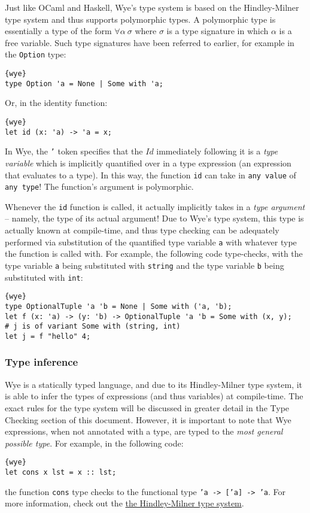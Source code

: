 \documentclass[a4paper, 12pt]{article}
\begin{document}
Just like OCaml and Haskell, Wye's type system is based on the Hindley-Milner type system and thus supports polymorphic types. A polymorphic type is essentially a type of the form $\forall \alpha\:\sigma$ where $\sigma$ is a type signature in which $\alpha$ is a free variable. Such type signatures have been referred to earlier, for example in the \texttt{Option} type:
\begin{lstlisting}{wye}
type Option 'a = None | Some with 'a;
\end{lstlisting}
Or, in the identity function:
\begin{lstlisting}{wye}
let id (x: 'a) -> 'a = x;
\end{lstlisting}
In Wye, the \texttt{'} token specifies that the $Id$ immediately following it is a \textit{type variable} which is implicitly quantified over in a type expression (an expression that evaluates to a type). In this way, the function \texttt{id} can take in \texttt{any value} of \texttt{any type}! The function's argument is polymorphic.

Whenever the \texttt{id} function is called, it actually implicitly takes in a \textit{type argument} -- namely, the type of its actual argument! Due to Wye's type system, this type is actually known at compile-time, and thus type checking can be adequately performed via substitution of the quantified type variable \texttt{a} with whatever type the function is called with. For example, the following code type-checks, with the type variable \texttt{a} being substituted with \texttt{string} and the type variable \texttt{b} being substituted with \texttt{int}:
\begin{lstlisting}{wye}
type OptionalTuple 'a 'b = None | Some with ('a, 'b);
let f (x: 'a) -> (y: 'b) -> OptionalTuple 'a 'b = Some with (x, y);
# j is of variant Some with (string, int)
let j = f "hello" 4;
\end{lstlisting}

\subsubsection{Type inference}

Wye is a statically typed language, and due to its Hindley-Milner type system, it is able to infer the types of expressions (and thus variables) at compile-time. The exact rules for the type system will be discussed in greater detail in the Type Checking section of this document. However, it is important to note that Wye expressions, when not annotated with a type, are typed to the \textit{most general possible type}. For example, in the following code:
\begin{lstlisting}{wye}
let cons x lst = x :: lst;
\end{lstlisting}
the function \texttt{cons} type checks to the functional type \texttt{'a -> ['a] -> 'a}. For more information, check out the \href{{https://en.wikipedia.org/wiki/Hindley%
\newpage
\end{document}
